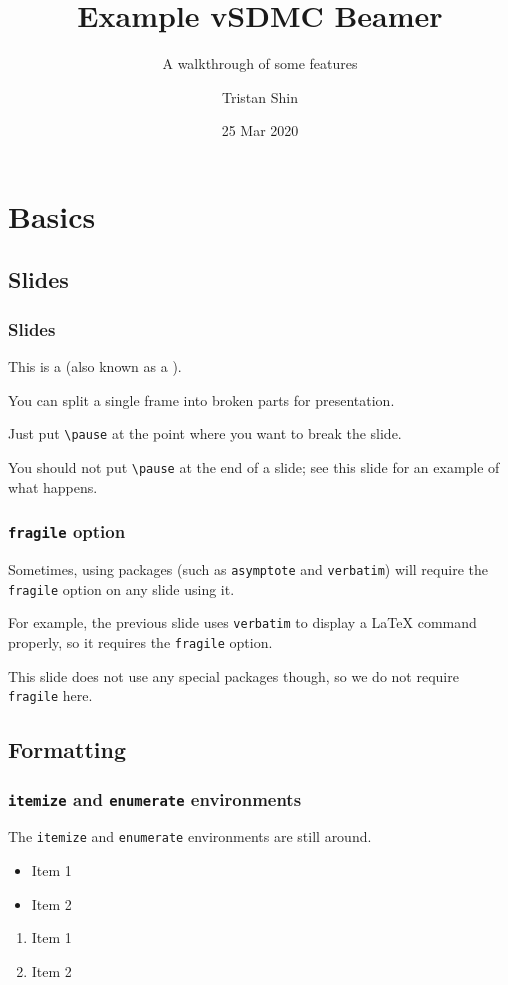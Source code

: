 \documentclass[mathserif]{beamer}
\title[vSDMC Example]{Example vSDMC Beamer}
\subtitle{A walkthrough of some features}
\author{Tristan Shin}
\date{25 Mar 2020}
\begin{document}
\frame{\titlepage}

\section{Basics}

\subsection{Slides}

\begin{frame}[fragile]\frametitle{Slides}
	This is a  (also known as a ).
	\pause
	
	You can split a single frame into broken parts for presentation.
	\pause
	
	Just put \verb|\pause| at the point where you want to break the slide.
	\pause
	
	You should not put \verb|\pause| at the end of a slide; see this slide for an example of what happens.
	\pause
\end{frame}

\begin{frame}\frametitle{\texttt{fragile} option}
	Sometimes, using packages (such as \texttt{asymptote} and \texttt{verbatim}) will require the \texttt{fragile} option on any slide using it.
	\pause
	
	For example, the previous slide uses \texttt{verbatim} to display a LaTeX command properly, so it requires the \texttt{fragile} option.
	\pause
	
	This slide does not use any special packages though, so we do not require \texttt{fragile} here.
\end{frame}

\subsection{Formatting}

\begin{frame}\frametitle{\texttt{itemize} and \texttt{enumerate} environments}
	The \texttt{itemize} and \texttt{enumerate} environments are still around.
	\begin{itemize}
		\item Item 1
		\item Item 2
	\end{itemize}
	\begin{enumerate}
		\item Item 1
		\item Item 2
	\end{enumerate}
\end{frame}
\end{document}
